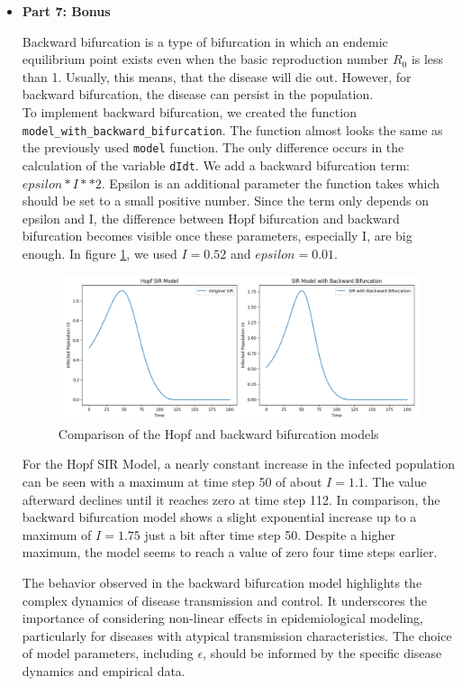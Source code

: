 \begin{itemize}
\item \textbf{Part 7: Bonus }

Backward bifurcation is a type of bifurcation in which an endemic equilibrium point exists even when the basic reproduction number $R_0$ is less than 1. Usually, this means, that the disease will die out. However, for backward bifurcation, the disease can persist in the population. \\

To implement backward bifurcation, we created the function \texttt{model\_with\_backward\_bifurcation}. The function almost looks the same as the previously used \texttt{model} function. The only difference occurs in the calculation of the variable \texttt{dIdt}. We add a backward bifurcation term: $epsilon * I ** 2$. 
Epsilon is an additional parameter the function takes which should be set to a small positive number. Since the term only depends on epsilon and I, the difference between Hopf bifurcation and backward bifurcation becomes visible once these parameters, especially I, are big enough. In figure \ref{fig:4-5-hb-comparison}, we used $I = 0.52$ and $epsilon = 0.01$. 

\begin{figure}[H]
    \centering
    \includegraphics[width=\textwidth]{images/task5/4-5-Hopf-Backward-Comparison.png}
    \caption{Comparison of the Hopf and backward bifurcation models}
    \label{fig:4-5-hb-comparison}
\end{figure}

For the Hopf SIR Model, a nearly constant increase in the infected population can be seen with a maximum at time step 50 of about $I = 1.1$. The value afterward declines until it reaches zero at time step 112. 
In comparison, the backward bifurcation model shows a slight exponential increase up to a maximum of $I = 1.75$ just a bit after time step 50. Despite a higher maximum, the model seems to reach a value of zero four time steps earlier. 

The behavior observed in the backward bifurcation model highlights the complex dynamics of disease transmission and control. It underscores the importance of considering non-linear effects in epidemiological modeling, particularly for diseases with atypical transmission characteristics. The choice of model parameters, including \( \epsilon \), should be informed by the specific disease dynamics and empirical data.
\end{itemize}